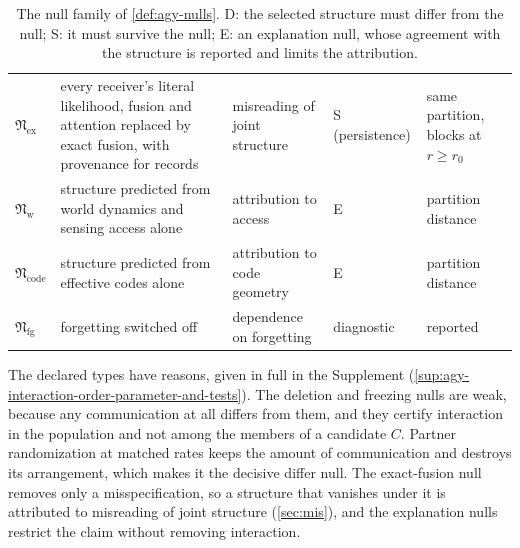 \begin{table}[tbp]
\begin{tabular}{@{}>{\raggedright\arraybackslash}p{1.25cm}>{\raggedright\arraybackslash}p{4.5cm}>{\raggedright\arraybackslash}p{3.3cm}>{\raggedright\arraybackslash}p{2.7cm}>{\raggedright\arraybackslash}p{3.6cm}@{}}
$\mathfrak N_{\mathrm{ex}}$ & every receiver's literal likelihood, fusion and attention replaced by exact fusion, with provenance for records & misreading of joint structure & S (persistence) & same partition, blocks at $r\ge r_0$ \\
$\mathfrak N_{\mathrm w}$ & structure predicted from world dynamics and sensing access alone & attribution to access & E & partition distance \\
$\mathfrak N_{\mathrm{code}}$ & structure predicted from effective codes alone & attribution to code geometry & E & partition distance \\
$\mathfrak N_{\mathrm{fg}}$ & forgetting switched off & dependence on forgetting & diagnostic & reported \\
\bottomrule
\end{tabular}
\caption{The null family of \cref{def:agy-nulls}. D: the selected structure must differ from the null; S: it must survive the null; E: an explanation null, whose agreement with the structure is reported and limits the attribution.}
\label{tab:agy-nulls}
\end{table}

The declared types have reasons, given in full in the Supplement (\cref{sup:agy-interaction-order-parameter-and-tests}). The deletion and freezing nulls are weak, because any communication at all differs from them, and they certify interaction in the population and not among the members of a candidate $C$. Partner randomization at matched rates keeps the amount of communication and destroys its arrangement, which makes it the decisive differ null. The exact-fusion null removes only a misspecification, so a structure that vanishes under it is attributed to misreading of joint structure (\cref{sec:mis}), and the explanation nulls restrict the claim without removing interaction.

